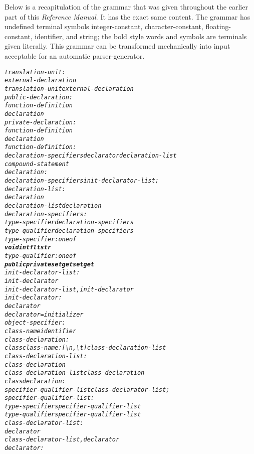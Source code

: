 \documentclass[12pt]{report}
\begin{document}
\begin{doublespace}
Below is a recapitulation of the grammar that was given throughout the earlier part of this \textit{Reference Manual}. It has the exact same content.
The grammar has undefined terminal symbols integer-constant, character-constant, floating-constant, identifier, and string; the bold style words and symbols are terminals given literally. This grammar can be transformed mechanically into input acceptable for an automatic parser-generator. 
\end{doublespace}
\begin{alltt}
     \textit{translation-unit:}
          \textit{external-declaration}
          \textit{translation-unit external-declaration}
     \textit{public-declaration:}
          \textit{function-definition}
          \textit{declaration}
     \textit{private-declaration:}
          \textit{function-definition}
          \textit{declaration}
     \textit{function-definition:}
          \textit{declaration-specifiers declarator declaration-list
               compound-statement}
     \textit{declaration:}
          \textit{declaration-specifiers init-declarator-list;}
     \textit{declaration-list:}
          \textit{declaration}
          \textit{declaration-list declaration}
     \textit{declaration-specifiers:}
          \textit{type-specifier declaration-specifiers}
          \textit{type-qualifier declaration-specifiers}
     \textit{type-specifier: one of}
          \textit{\textbf{void   int   flt   str}}
     \textit{type-qualifier: one of}
          \textit{\textbf{public   private   set   get  setget}}
     \textit{init-declarator-list:}
          \textit{init-declarator}
          \textit{init-declarator-list, init-declarator}
     \textit{init-declarator:}
          \textit{declarator}
          \textit{declarator = initializer}
     \textit{object-specifier:}
          \textit{class-name identifier}
     \textit{class-declaration:}
          \textit{class class-name: [\textbackslash n, \textbackslash t] class-declaration-list}
     \textit{class-declaration-list:}
          \textit{class-declaration}
          \textit{class-declaration-list class-declaration}
     \textit{class declaration:}
          \textit{specifier-qualifier-list class-declarator-list;}
     \textit{specifier-qualifier-list:}
          \textit{type-specifier specifier-qualifier-list}
          \textit{type-qualifier specifier-qualifier-list}
     \textit{class-declarator-list:}
          \textit{declarator}
          \textit{class-declarator-list, declarator}
     \textit{declarator:}

\end{alltt}
\end{document}
